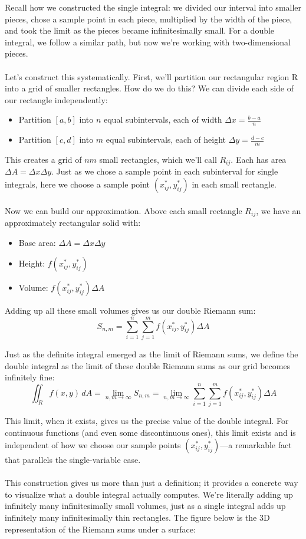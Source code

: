 \noindent Recall how we constructed the single integral: we divided our interval into smaller pieces, chose a sample point in each piece, multiplied by the width of the piece, and took the limit as the pieces became infinitesimally small. For a double integral, we follow a similar path, but now we're working with two-dimensional pieces. \\ \\
Let's construct this systematically. First, we'll partition our rectangular region R into a grid of smaller rectangles. How do we do this? We can divide each side of our rectangle independently:
\begin{itemize}
    \item Partition \([a,b]\) into \(n\) equal subintervals, each of width \(\Delta x = \frac{b-a}{n}\)
    \item Partition \([c,d]\) into \(m\) equal subintervals, each of height \(\Delta y = \frac{d-c}{m}\)
\end{itemize}

\noindent This creates a grid of \(nm\) small rectangles, which we'll call \(R_{ij}\). Each has area \(\Delta A = \Delta x \Delta y\). Just as we chose a sample point in each subinterval for single integrals, here we choose a sample point \((x_{ij}^*, y_{ij}^*)\) in each small rectangle. \\ \\
Now we can build our approximation. Above each small rectangle \(R_{ij}\), we have an approximately rectangular solid with:
\begin{itemize}
    \item Base area: \(\Delta A = \Delta x \Delta y\)
    \item Height: \(f(x_{ij}^*, y_{ij}^*)\)
    \item Volume: \(f(x_{ij}^*, y_{ij}^*)\Delta A\)
\end{itemize}

\noindent Adding up all these small volumes gives us our double Riemann sum:
\[
S_{n,m} = \sum_{i=1}^n \sum_{j=1}^m f(x_{ij}^*, y_{ij}^*) \Delta A
\]

\noindent Just as the definite integral emerged as the limit of Riemann sums, we define the double integral as the limit of these double Riemann sums as our grid becomes infinitely fine:
\[
\iint_R f(x,y) \, dA = \lim_{n,m \to \infty} S_{n,m} = \lim_{n,m \to \infty} \sum_{i=1}^n \sum_{j=1}^m f(x_{ij}^*, y_{ij}^*) \Delta A
\]

\noindent This limit, when it exists, gives us the precise value of the double integral. For continuous functions (and even some discontinuous ones), this limit exists and is independent of how we choose our sample points \((x_{ij}^*, y_{ij}^*)\)—a remarkable fact that parallels the single-variable case. \\ \\
This construction gives us more than just a definition; it provides a concrete way to visualize what a double integral actually computes. We're literally adding up infinitely many infinitesimally small volumes, just as a single integral adds up infinitely many infinitesimally thin rectangles. The figure below is the 3D representation of the Riemann sums under a surface:

